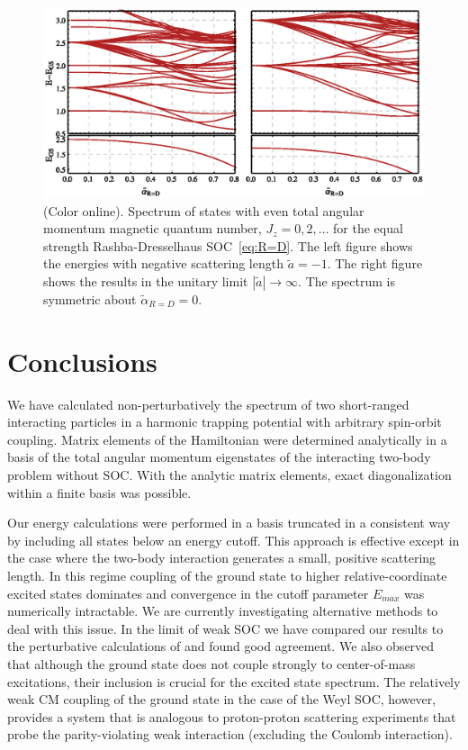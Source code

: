 \documentclass[%
 notitlepage,
 preprint,
showpacs,%
 amsmath,amssymb,
 aps,
pra,
]{revtex4-1}
\begin{document}
\begin{figure}
\includegraphics{Figures/RashbaDresselhausSpectrum}
\caption{\label{fig:R=DExcitationSpectrum} (Color online). 
Spectrum of states with even total angular momentum magnetic quantum number, $J_z=0,2,\dots$ for the equal strength Rashba-Dresselhaus SOC~\eqref{eq:R=D}. The left figure shows the energies with negative scattering length $\tilde{a}=-1$. The right figure shows the results in the unitary limit $|\tilde{a}|\rightarrow\infty$. The spectrum is symmetric about $\tilde{\alpha}_{R=D}=0$.} 
\end{figure}


\section{Conclusions}

We have calculated non-perturbatively the spectrum of two short-ranged interacting particles in a harmonic trapping potential with arbitrary spin-orbit coupling. Matrix elements of the Hamiltonian were determined analytically in a basis of the total angular momentum eigenstates of the interacting two-body problem without SOC. With the analytic matrix elements, exact diagonalization within a finite basis was possible.

Our energy calculations were performed in a basis truncated in a consistent way by including all states below an energy cutoff. This approach is effective except in the case where the two-body interaction generates a small, positive scattering length. In this regime coupling of the ground state to higher relative-coordinate excited states dominates and convergence in the cutoff parameter $E_{max}$ was numerically intractable. We are currently investigating alternative methods to deal with this issue. In the limit of weak SOC we have compared our results to the perturbative calculations of \cite{PhysRevA.89.033606} and found good agreement. We also observed that although the ground state does not couple strongly to center-of-mass excitations, their inclusion is crucial for the excited state spectrum.  The relatively weak CM coupling of the ground state in the case of the Weyl SOC, however, provides a system that is analogous to proton-proton scattering experiments that probe the parity-violating weak interaction (excluding the Coulomb interaction). 
\end{document}
